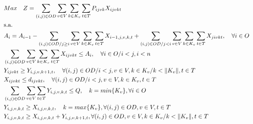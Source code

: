 \begin{align}
	& Max \quad Z = \sum_{(i,j)\in OD} \sum_{v\in V} \sum_{k\in K_v} \sum_{t\in T} P_{ijvk} X_{ijvkt}                                                                                                                \label{eq: m1_fo}                          \\
	& \text{s.a.}  \notag                                                                                                                                                                                                                                       \\
	& A_{i} = A_{i-1} - \sum_{(i,j) \in OD/j \geq i} \sum_{v\in V} \sum_{k\in K_v}\sum_{t\in T}X_{i-1,j,v,k,t} + \sum_{(i,j) \in OD/j<i}\sum_{v\in V} \sum_{k\in K_v}\sum_{t\in T}X_{jivkt}, \quad \forall i \in O  \label{eq: m1_disponi}                     \\
	& \sum_{(i,j) \in OD}\sum_{v\in V} \sum_{k\in K_v}\sum_{t\in T} X_{ijvkt} \leq A_{i} , \quad \forall i \in O /i<j, i < n                                                                                        \label{eq: m1_cap_assig}                   \\
	& Y_{ijvkt} \geq Y_{i,j,v,k+1,t},  \quad \forall (i,j) \in OD / i < j, v \in V, k \in K_v / k < \lVert K_v \rVert , t \in T                                                                                                                     \label{eq: m1_jerar_class}                 \\   %
	& X_{ijvkt} \leq d_{ijvkt},  \quad \forall (i,j) \in OD / i < j  ,v \in V, k \in K_v, t\in T                                                                                                                                                  \label{eq: m1_assig_menor_dem}             \\
	& \sum_{(i,j) \in OD}\sum_{v\in V}\sum_{t\in T} Y_{i,j,v,k,t} \leq Q, \quad  k = min\{K_v\}, \forall i \in O                                                                                                  \label{eq: m1_cap_autho_1er_class}         \\
	& Y_{i,j,v,k,t} \geq  X_{i,j,v,k,t},  \quad k = max\{K_v\}, \forall(i,j) \in OD ,v \in V, t \in T                                                                                                                                     \label{eq: m1_autho_mayor_assig_1er_class} \\
	& Y_{i,j,v,k,t} \geq  X_{i,j,v,k,t} + Y_{i,j,v,k + 1,t} , \forall(i,j) \in OD, v \in V, k \in K_v / k < \lVert K_v \rVert , t \in T                                                                                                            \label{eq: m1_autho_mayor_assig_mas_autho} \\

\end{align}
